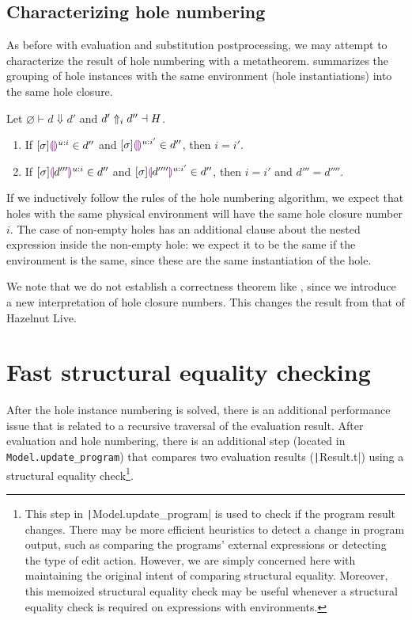 \subsection{Characterizing hole numbering}
\label{sec:hole-numbering-characterization}

As before with evaluation and substitution postprocessing, we may attempt to characterize the result of hole numbering with a metatheorem.  summarizes the grouping of hole instances with the same environment (hole instantiations) into the same hole closure.

\begin{theorem}
  Let $\varnothing\vdash d\Downarrow d'$ and $d'\Uparrow_{i} d''\dashv H$.
  \begin{enumerate}
  \item If $[\sigma]\textcolor{violet}{\llparenthesis}\textcolor{violet}{\rrparenthesis}^{u:i}\in d''$ and $[\sigma]\textcolor{violet}{\llparenthesis}\textcolor{violet}{\rrparenthesis}^{u:i'}\in d''$, then $i=i'$.
  \item If $[\sigma]\textcolor{violet}{\llparenthesis} d'''\textcolor{violet}{\rrparenthesis}^{u:i}\in d''$ and $[\sigma]\textcolor{violet}{\llparenthesis} d''''\textcolor{violet}{\rrparenthesis}^{u:i'}\in d''$, then $i=i'$ and $d'''=d''''$.
  \end{enumerate}
  \label{thm:hole-numbering-postprocessing}
\end{theorem}

If we inductively follow the rules of the hole numbering algorithm, we expect that holes with the same physical environment will have the same hole closure number $i$. The case of non-empty holes has an additional clause about the nested expression inside the non-empty hole: we expect it to be the same if the environment is the same, since these are the same instantiation of the hole.

We note that we do not establish a correctness theorem like , since we introduce a new interpretation of hole closure numbers. This changes the result from that of Hazelnut Live.

\section{Fast structural equality checking}
\label{sec:fast-equals}

After the hole instance numbering is solved, there is an additional performance issue that is related to a recursive traversal of the evaluation result. After evaluation and hole numbering, there is an additional step (located in \texttt{Model.update_program}) that compares two evaluation results (\texttt|Result.t|) using a structural equality check\footnote{This step in \texttt|Model.update_program| is used to check if the program result changes. There may be more efficient heuristics to detect a change in program output, such as comparing the programs' external expressions or detecting the type of edit action. However, we are simply concerned here with maintaining the original intent of comparing structural equality. Moreover, this memoized structural equality check may be useful whenever a structural equality check is required on expressions with environments.}.

